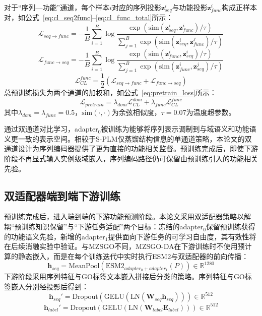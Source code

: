 对于“序列—功能”通道，每个样本$i$对应的序列投影$\mathbf{z}_{seq}^i$与功能投影$\mathbf{z}_{func}^i$构成正样本对，如公式~\eqref{eq:cl_seq2func}--\eqref{eq:cl_func_total}所示：
\begin{equation}
\label{eq:cl_seq2func}
    \mathcal{L}_{seq \to func} = -\frac{1}{B}\sum_{i=1}^{B}
    \log
    \frac{\exp(\text{sim}(\mathbf{z}_{seq}^i,\mathbf{z}_{func}^i)/\tau)}
    {\sum_{j=1}^{B}\exp(\text{sim}(\mathbf{z}_{seq}^i,\mathbf{z}_{func}^j)/\tau)}
\end{equation}
\begin{equation}
\label{eq:cl_func2seq}
    \mathcal{L}_{func \to seq} = -\frac{1}{B}\sum_{i=1}^{B}
    \log
    \frac{\exp(\text{sim}(\mathbf{z}_{func}^i,\mathbf{z}_{seq}^i)/\tau)}
    {\sum_{j=1}^{B}\exp(\text{sim}(\mathbf{z}_{func}^i,\mathbf{z}_{seq}^j)/\tau)}
\end{equation}
\begin{equation}
\label{eq:cl_func_total}
    \mathcal{L}_{CL}^{func} = \frac{1}{2}\left(\mathcal{L}_{seq \to func} + \mathcal{L}_{func \to seq}\right)
\end{equation}
总预训练损失为两个通道的加权和，如公式~\eqref{eq:pretrain_loss}所示：
\begin{equation}
\label{eq:pretrain_loss}
    \mathcal{L}_{pretrain} = \lambda_{dom}\mathcal{L}_{CL}^{dom} + \lambda_{func}\mathcal{L}_{CL}^{func}
\end{equation}
其中$\lambda_{dom}=\lambda_{func}=0.5$，$\text{sim}(\cdot,\cdot)$为余弦相似度，$\tau=0.07$为温度超参数。

通过双通道对比学习，adapter$_0$被训练为能够将序列表示调制到与域语义和功能语义更一致的表示空间。相较于S-PLM\cite{wang2025splm}仅蒸馏结构信息的单通道策略，本论文的双通道设计为序列编码器提供了更为直接的功能相关监督。预训练完成后，即使下游阶段不再显式输入实例级域嵌入，序列编码路径仍可保留由预训练引入的功能相关先验。

\subsection{双适配器端到端下游训练}

预训练完成后，进入端到端的下游功能预测阶段。本论文采用双适配器策略以解耦“预训练知识保留”与“下游任务适配”两个目标：冻结的adapter$_0$保留预训练获得的功能语义先验，新增的adapter$_1$提供面向下游任务的可学习自由度，其有效性将在后续消融实验中验证。与MZSGO不同，MZSGO-DA在下游训练时不使用预计算的静态嵌入，而是在每个训练迭代中实时执行ESM2与双适配器的前向传播：
\begin{equation}
    \mathbf{h}_{seq} = \text{MeanPool}(\text{ESM2}_{adapter_0+adapter_1}(P)) \in \mathbb{R}^{1280}
\end{equation}
下游阶段采用序列特征与GO标签文本嵌入拼接后分类的策略。序列特征与GO标签嵌入分别经投影后得到：
\begin{equation}
    \mathbf{h}_{seq}' = \text{Dropout}(\text{GELU}(\text{LN}(\mathbf{W}_{seq}\mathbf{h}_{seq}))) \in \mathbb{R}^{512}
\end{equation}
\begin{equation}
    \mathbf{h}_{label}' = \text{Dropout}(\text{GELU}(\text{LN}(\mathbf{W}_{label}\mathbf{E}_{label}))) \in \mathbb{R}^{512}
\end{equation}

